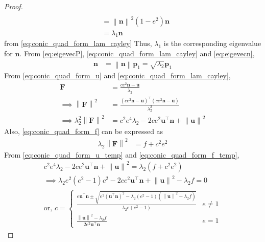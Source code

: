 \documentclass[]{interact}
\theoremstyle{plain}%
\theoremstyle{definition}
\theoremstyle{remark}
\providecommand{\brak}[1]{\ensuremath{\left(#1\right)}}
\providecommand{\norm}[1]{\left\lVert#1\right\rVert}
\let\vec\mathbf
\begin{document}
\begin{proof}
\begin{align}
\\
&=\norm{\vec{n}}^2\brak{1-e^2}\vec{n} 
 \\
  &=\lambda_1 \vec{n} 
  \label{eq:eigevecn}
\end{align}  
from \eqref{eq:conic_quad_form_lam_cayley}
Thus,  $\lambda_1$ is the corresponding eigenvalue for $\vec{n}$.  From       \eqref{eq:eigevecP},   \eqref{eq:conic_quad_form_lam_cayley} and \eqref{eq:eigevecn}, 
\begin{align}
   \vec{n}&= \norm{\vec{n}}\vec{p}_1  = \sqrt{\lambda_2}\vec{p}_1 
\end{align}  
From \eqref{eq:conic_quad_form_u} and \eqref{eq:conic_quad_form_lam_cayley},
\begin{align}
\vec{F}  &= \frac{ce^2\vec{n}-\vec{u}}{\lambda_2}
 \\
 \implies \norm{\vec{F}}^2  &= \frac{\brak{ce^2\vec{n}-\vec{u}}^{\top}\brak{ce^2\vec{n}-\vec{u}}}{\lambda_2^2}
 \\
 \implies \lambda_2^2\norm{\vec{F}}^2  &= c^2e^4\lambda_2-2ce^2\vec{u}^{\top}\vec{n}+\norm{\vec{u}}^2
 \label{eq:conic_quad_form_u_temp}
    \end{align}
    Also, \eqref{eq:conic_quad_form_f} can be expressed as
    \begin{align}
    \lambda_2\norm{\vec{F}}^2 &= f+c^2e^2
    \label{eq:conic_quad_form_f_temp}
\end{align}
From  \eqref{eq:conic_quad_form_u_temp} and     \eqref{eq:conic_quad_form_f_temp},
\begin{align}
c^2e^4\lambda_2-2ce^2\vec{u}^{\top}\vec{n}+\norm{\vec{u}}^2 = \lambda_2\brak{f+c^2e^2}
\\
\implies \lambda_2e^2\brak{e^2-1}c^2-2ce^2\vec{u}^{\top}\vec{n}+\norm{\vec{u}}^2 - \lambda_2 f = 0
\\
\text{or, } c = 
\begin{cases}
  \frac{e\vec{u}^{\top}\vec{n} \pm \sqrt{e^2\brak{\vec{u}^{\top}\vec{n}}^2-\lambda_2\brak{e^2-1}\brak{\norm{\vec{u}}^2 - \lambda_2 f}}}{\lambda_2e\brak{e^2-1}} & e \ne 1
  \\
  \frac{\norm{\vec{u}}^2 - \lambda_2 f   }{2e^2\vec{u}^{\top}\vec{n}} & e = 1
\end{cases}
\end{align}


\end{proof}
\end{document}
